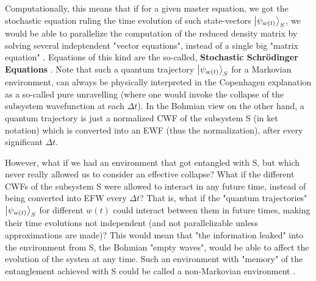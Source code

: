 \documentclass[11pt, a4paper]{article} %
\begin{document}
Computationally, this means that if for a given master equation, we got the stochastic equation ruling the time evolution of such state-vectors $\ket{\psi_{w(t)}}_S$, we would be able to parallelize the computation of the reduced density matrix by solving several indeptendent "vector equations", instead of a single big "matrix equation" \cite{MarkovianityDefs, QuantumTrajs}. Equations of this kind are the so-called, {\bf Stochastic Schrödinger Equations} \cite{Generalized, continousMeas}. Note that such a quantum trajectory $\ket{\psi_{w(t)}}_S$ for a Markovian environment, can always be physically interpreted in the Copenhagen explanation as a so-called pure unravelling \cite{MarkovianityDefs} (where one would invoke the collapse of the subsystem wavefunction at each $\Delta t$). In the Bohmian view on the other hand, a quantum trajectory is just a normalized CWF of the subsystem S (in ket notation) which is converted into an EWF (thus the normalization), after every significant $\Delta t$.\vspace{-0.05cm}
 

However, what if we had an environment that got entangled with S, but which never really allowed us to consider an effective collapse? What if the different CWFs of the subsystem S were allowed to interact in any future time, instead of being converted into EFW every $\Delta t$? That is, what if the "quantum trajectories" $\ket{\psi_{w(t)}}_S$ for different $w(t)$ could interact between them in future times, making their time evolutions not independent (and not parallelizable unless approximations are made)? This would mean that "the information leaked" into the environment from S, the Bohmian "empty waves", would be able to affect the evolution of the systen at any time. Such an environment with "memory" of the entanglement achieved with S could be called a non-Markovian environment \cite{MarkovianityDefs}. 
\end{document}
